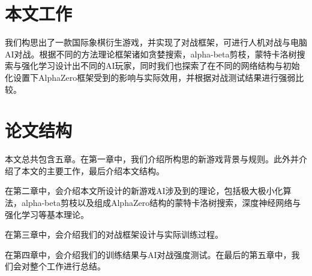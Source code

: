 \section{本文工作}
我们构思出了一款国际象棋衍生游戏，并实现了对战框架，可进行人机对战与电脑AI对战。根据不同的方法理论框架诸如贪婪搜索，alpha-beta剪枝，蒙特卡洛树搜索与强化学习设计出不同的AI玩家，同时我们也探索了在不同的网络结构与初始化设置下AlphaZero框架受到的影响与实际效用，并根据对战测试结果进行强弱比较。
\section{论文结构}
本文总共包含五章。在第一章中，我们介绍所构思的新游戏背景与规则。此外并介绍了本文的主要工作，最后介绍本文结构。

在第二章中，会介绍本文所设计的新游戏AI涉及到的理论，包括极大极小化算法，alpha-beta剪枝以及组成AlphaZero结构的蒙特卡洛树搜索，深度神经网络与强化学习等基本理论。

在第三章中，会介绍我们的对战框架设计与实际训练过程。

在第四章中，会介绍我们的训练结果与AI对战强度测试。在最后的第五章中，我们会对整个工作进行总结。

